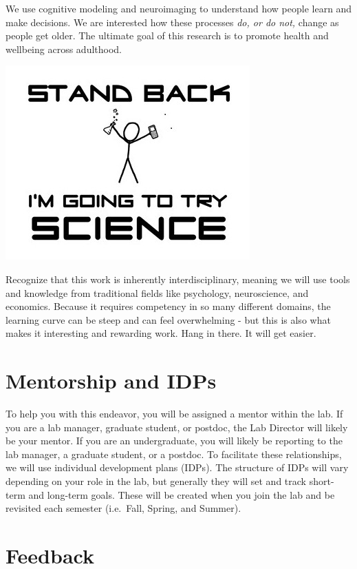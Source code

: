 \documentclass[]{book}
\begin{document}
We use cognitive modeling and neuroimaging to understand how people learn and make decisions. We are interested how these processes \emph{do, or do not,} change as people get older. The ultimate goal of this research is to promote health and wellbeing across adulthood.

\includegraphics{images/xkcd_science.png}

Recognize that this work is inherently interdisciplinary, meaning we will use tools and knowledge from traditional fields like psychology, neuroscience, and economics. Because it requires competency in so many different domains, the learning curve can be steep and can feel overwhelming - but this is also what makes it interesting and rewarding work. Hang in there. It will get easier.

\hypertarget{mentorship-and-idps}{%
\section{Mentorship and IDPs}\label{mentorship-and-idps}}

To help you with this endeavor, you will be assigned a mentor within the lab. If you are a lab manager, graduate student, or postdoc, the Lab Director will likely be your mentor. If you are an undergraduate, you will likely be reporting to the lab manager, a graduate student, or a postdoc. To facilitate these relationships, we will use individual development plans (IDPs). The structure of IDPs will vary depending on your role in the lab, but generally they will set and track short-term and long-term goals. These will be created when you join the lab and be revisited each semester (i.e.~Fall, Spring, and Summer).

\hypertarget{feedback}{%
\section{Feedback}\label{feedback}}
\end{document}
